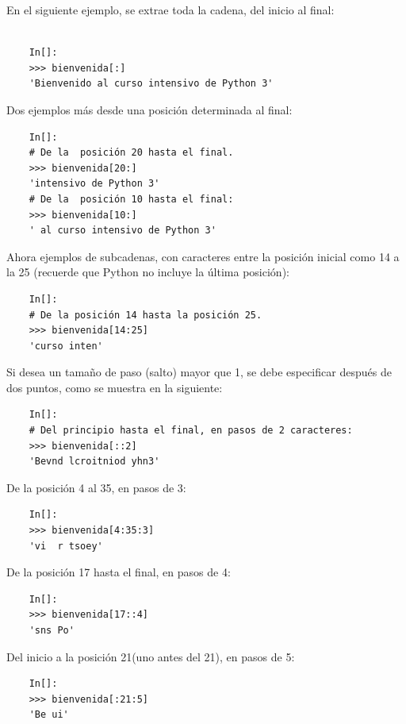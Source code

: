 \noindent En el siguiente ejemplo, se extrae toda la cadena, del inicio al final:

\begin{lstlisting}
	
	In[]:
	>>> bienvenida[:]
	'Bienvenido al curso intensivo de Python 3'
\end{lstlisting}

\noindent Dos ejemplos más desde una posición determinada al final:

\begin{lstlisting}
	In[]:	
	# De la  posición 20 hasta el final.
	>>> bienvenida[20:]
	'intensivo de Python 3'
	# De la  posición 10 hasta el final:
	>>> bienvenida[10:]
	' al curso intensivo de Python 3'
\end{lstlisting}



\noindent Ahora ejemplos de subcadenas, con caracteres entre la posición inicial como 14 a la  25 (recuerde que Python no incluye la última posición):

\begin{lstlisting}
	In[]:	
	# De la posición 14 hasta la posición 25.
	>>> bienvenida[14:25]
	'curso inten'
\end{lstlisting}

Si desea un tamaño de paso (salto) mayor que 1, se debe especificar  después de dos puntos, como se muestra en la siguiente:

\begin{lstlisting}
	In[]:
	# Del principio hasta el final, en pasos de 2 caracteres:
	>>> bienvenida[::2]
	'Bevnd lcroitniod yhn3'
\end{lstlisting}


\noindent De la posición  4 al 35, en pasos de 3:

\begin{lstlisting}
	In[]:	
	>>> bienvenida[4:35:3]
	'vi  r tsoey'
\end{lstlisting}

\noindent De la posición 17 hasta el final, en pasos de 4:

\begin{lstlisting}
	In[]:	
	>>> bienvenida[17::4]
	'sns Po'
\end{lstlisting}


\noindent Del inicio a la posición 21(uno antes del 21), en pasos de 5:

\begin{lstlisting}
	In[]:	
	>>> bienvenida[:21:5]
	'Be ui'
\end{lstlisting}

